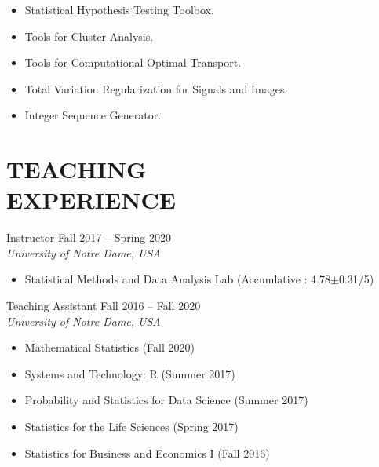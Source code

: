 \documentclass[margin, 10pt]{res} %
\begin{document}
\begin{resume}
\begin{itemize}
    \item{  Statistical Hypothesis Testing Toolbox.}
    \item{  Tools for Cluster Analysis.}
    \item{  Tools for Computational Optimal Transport.}
    \item{ Total Variation Regularization for Signals and Images.}
    \item{  Integer Sequence Generator.}
\end{itemize}
\vspace{.2cm}



 
\section{\sf TEACHING\\ EXPERIENCE}

Instructor \hfill Fall 2017 -- Spring 2020 \\
{\sl University of Notre Dame, USA}
\begin{itemize} \itemsep -2pt
	\item Statistical Methods and Data Analysis Lab (Accumlative : 4.78$\pm$0.31/5)
\end{itemize}

Teaching Assistant \hfill Fall 2016 -- Fall 2020 \\
{\sl University of Notre Dame, USA}
\begin{itemize} \itemsep -2pt
	\item Mathematical Statistics (Fall 2020)
	\item Systems and Technology: R (Summer 2017)
	\item Probability and Statistics for Data Science (Summer 2017)
	\item Statistics for the Life Sciences (Spring 2017)
	\item Statistics for Business and Economics I (Fall 2016)
\end{itemize}


\end{resume}
\end{document}
